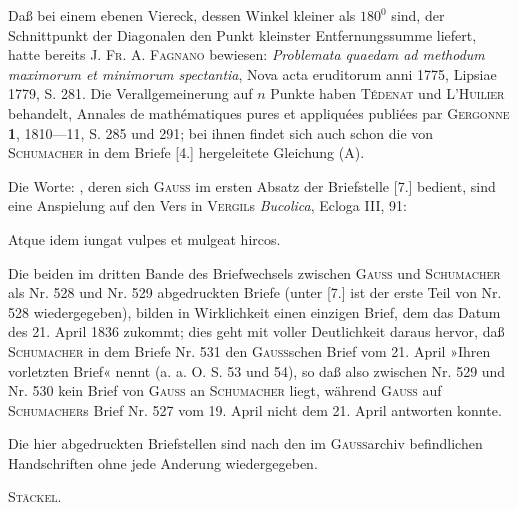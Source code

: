 \clearpage{}
\begingroup\small
{}
\indent Daß bei einem ebenen Viereck, dessen Winkel kleiner als \(180^{0}\) sind, der Schnittpunkt der Diagonalen den Punkt kleinster Entfernungssumme liefert, hatte bereits \textsc{J. Fr. A. Fagnano} bewiesen: \textit{Problemata quaedam ad methodum maximorum et minimorum spectantia}, Nova acta eruditorum anni 1775, Lipsiae 1779, S. 281. Die Verallgemeinerung auf \(n\) Punkte haben \textsc{Tédenat} und \textsc{L’Huilier} behandelt, Annales de mathématiques pures et appliquées publiées par \textsc{Gergonne} \textbf{1}, 1810—11, S. 285 und 291; bei ihnen findet sich auch schon die von \textsc{Schumacher} in dem Briefe [4.] hergeleitete Gleichung (A).

\indent Die Worte: , deren sich \textsc{Gauss} im ersten Absatz der Briefstelle [7.] bedient, sind eine Anspielung auf den Vers in \textsc{Vergil}s \textit{Bucolica}, Ecloga III, 91:
\begin{center}Atque idem iungat vulpes et mulgeat hircos.\end{center}

\indent Die beiden im dritten Bande des Briefwechsels zwischen \textsc{Gauss} und \textsc{Schumacher} als Nr. 528 und Nr. 529 abgedruckten Briefe (unter [7.] ist der erste Teil von Nr. 528 wiedergegeben), bilden in Wirklichkeit einen einzigen Brief, dem das Datum des 21. April 1836 zukommt; dies geht mit voller Deutlichkeit daraus hervor, daß \textsc{Schumacher} in dem Briefe Nr. 531 den \textsc{Gauss}schen Brief vom 21. April »Ihren vorletzten Brief« nennt (a. a. O. S. 53 und 54), so daß also zwischen Nr. 529 und Nr. 530 kein Brief von \textsc{Gauss} an \textsc{Schumacher} liegt, während \textsc{Gauss} auf \textsc{Schumacher}s Brief Nr. 527 vom 19. April nicht  dem 21. April antworten konnte.

\indent Die hier abgedruckten Briefstellen sind nach den im \textsc{Gauss}archiv befindlichen Handschriften ohne jede Anderung wiedergegeben.
\par\noindent\hfill\textsc{Stäckel}.
\ClosingRule
\par\endgroup
